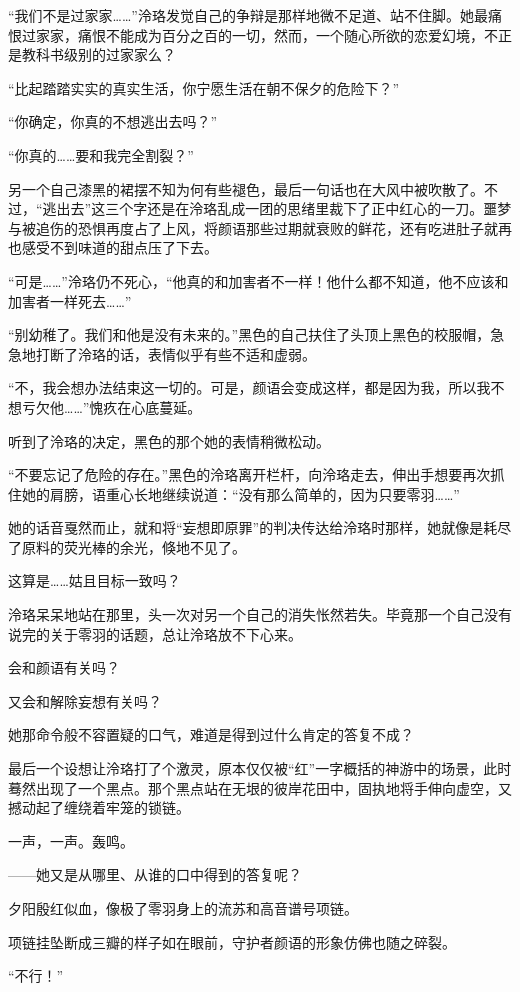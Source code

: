 \documentclass[UTF8, scheme = chinese, openany]{ctexbook}
\begin{document}
“我们不是过家家……”泠珞发觉自己的争辩是那样地微不足道、站不住脚。她最痛恨过家家，痛恨不能成为百分之百的一切，然而，一个随心所欲的恋爱幻境，不正是教科书级别的过家家么？

“比起踏踏实实的真实生活，你宁愿生活在朝不保夕的危险下？”

“你确定，你真的不想逃出去吗？”

“你真的……要和我完全割裂？”

另一个自己漆黑的裙摆不知为何有些褪色，最后一句话也在大风中被吹散了。不过，“逃出去”这三个字还是在泠珞乱成一团的思绪里裁下了正中红心的一刀。噩梦与被追伤的恐惧再度占了上风，将颜语那些过期就衰败的鲜花，还有吃进肚子就再也感受不到味道的甜点压了下去。

“可是……”泠珞仍不死心，“他真的和加害者不一样！他什么都不知道，他不应该和加害者一样死去……”

“别幼稚了。我们和他是没有未来的。”黑色的自己扶住了头顶上黑色的校服帽，急急地打断了泠珞的话，表情似乎有些不适和虚弱。

“不，我会想办法结束这一切的。可是，颜语会变成这样，都是因为我，所以我不想亏欠他……”愧疚在心底蔓延。

听到了泠珞的决定，黑色的那个她的表情稍微松动。

“不要忘记了危险的存在。”黑色的泠珞离开栏杆，向泠珞走去，伸出手想要再次抓住她的肩膀，语重心长地继续说道：“没有那么简单的，因为只要零羽……”

她的话音戛然而止，就和将“妄想即原罪”的判决传达给泠珞时那样，她就像是耗尽了原料的荧光棒的余光，倏地不见了。

这算是……姑且目标一致吗？

泠珞呆呆地站在那里，头一次对另一个自己的消失怅然若失。毕竟那一个自己没有说完的关于零羽的话题，总让泠珞放不下心来。

会和颜语有关吗？

又会和解除妄想有关吗？

她那命令般不容置疑的口气，难道是得到过什么肯定的答复不成？

最后一个设想让泠珞打了个激灵，原本仅仅被“红”一字概括的神游中的场景，此时蓦然出现了一个黑点。那个黑点站在无垠的彼岸花田中，固执地将手伸向虚空，又撼动起了缠绕着牢笼的锁链。

一声，一声。轰鸣。

——她又是从哪里、从谁的口中得到的答复呢？

夕阳殷红似血，像极了零羽身上的流苏和高音谱号项链。

项链挂坠断成三瓣的样子如在眼前，守护者颜语的形象仿佛也随之碎裂。

“不行！”
\end{document}
